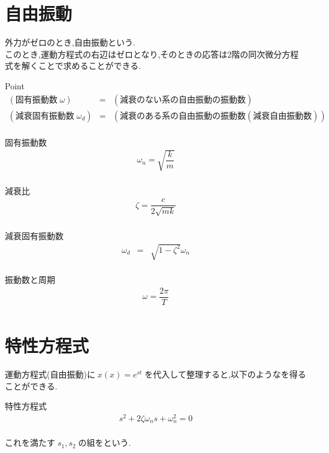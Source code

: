 \documentclass[a4paper]{jsarticle}
\begin{document}
\section{自由振動}
外力がゼロのとき,自由振動という.\\
このとき,運動方程式の右辺はゼロとなり,そのときの応答は2階の同次微分方程式を解くことで求めることができる.
\begin{itembox}[l]{Point}
    \begin{eqnarray*}
        (固有振動数\;\omega)&=&(減衰のない系の自由振動の振動数)\\
        (減衰固有振動数\;\omega_d)&=&(減衰のある系の自由振動の振動数(減衰自由振動数))\\
    \end{eqnarray*}
\end{itembox}
\begin{itembox}[l]{固有振動数}
    \begin{eqnarray*}
        \omega_n = \sqrt{\dfrac{k}{m}}\\
    \end{eqnarray*}
\end{itembox}
\begin{itembox}[l]{減衰比}
    \begin{eqnarray*}
        \zeta = \dfrac{c}{2\sqrt{mk}}\\
    \end{eqnarray*}
\end{itembox}
\begin{itembox}[l]{減衰固有振動数}
    \begin{eqnarray*}
        \omega_d&=&\sqrt{1-\zeta^2}\omega_n\\
    \end{eqnarray*}
\end{itembox}
\begin{itembox}[l]{振動数と周期}
    \begin{eqnarray*}
        \omega=\dfrac{2\pi}{T}\\
    \end{eqnarray*}
\end{itembox}
\section{特性方程式}
運動方程式(自由振動)に$\; x\left(x\right)=e^{st}\;$を代入して整理すると,以下のようなを得ることができる.
\begin{itembox}[l]{特性方程式}
    \begin{eqnarray*}
        s^2+2\zeta\omega_ns+\omega_n^2=0\\
    \end{eqnarray*}
\end{itembox}
これを満たす$\; s_1,s_2\;$の組をという.
\end{document}
